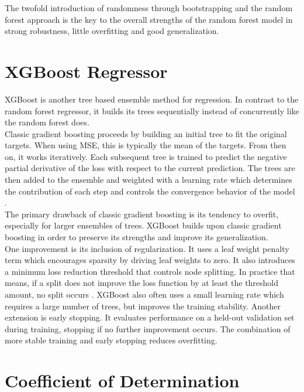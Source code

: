 The twofold introduction of randomness through bootstrapping and the random forest approach is the key to the overall strengths of the random forest model in strong robustness, little overfitting and good generalization.




\section{XGBoost Regressor}

XGBoost is another tree based ensemble method for regression. In contrast to the random forest regressor, it builds its trees sequentially instead of concurrently like the random forest does. \\
Classic gradient boosting proceeds by building an initial tree to fit the original targets. When using MSE, this is typically the mean of the targets. From then on, it works iteratively. Each subsequent tree is trained to predict the negative partial derivative of the loss with respect to the current prediction. The trees are then added to the ensemble and weighted with a learning rate which determines the contribution of each step and controls the convergence behavior of the model \cite{chen_xgboost_2016}. \\
The primary drawback of classic gradient boosting is its tendency to overfit, especially for larger ensembles of trees. XGBoost builds upon classic gradient boosting in order to preserve its strengths and improve its generalization. \\
One improvement is its inclusion of regularization. It uses a leaf weight penalty term which encourages sparsity by driving leaf weights to zero. It also introduces a minimum loss reduction threshold that controls node splitting. In practice that means, if a split does not improve the loss function by at least the threshold amount, no split occurs \cite{chen_xgboost_2016}. XGBoost also often uses a small learning rate which requires a large number of trees, but improves the training stability. Another extension is early stopping. It evaluates performance on a held-out validation set during training, stopping if no further improvement occurs. The combination of more stable training and early stopping reduces overfitting.




\section{Coefficient of Determination}


